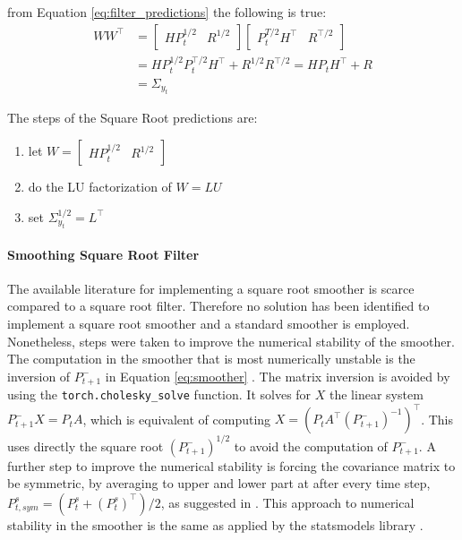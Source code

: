 \documentclass{article}
\begin{document}
from Equation \ref{eq:filter_predictions} the following is true:
\begin{align*}
  WW^\top &=
  \begin{bmatrix}HP_{t}^{1/2} & R^{1/2}\end{bmatrix}\begin{bmatrix}P_{t}^{T/2}H^\top & R^{\top/2}\end{bmatrix} \\
  &= HP_{t}^{1/2}P_{t}^{\top/2}H^\top + R^{1/2}R^{\top/2} = HP_{t}H^\top + R \\ &= \Sigma_{y_t}
\end{align*}

The steps of the Square Root predictions are:
\begin{enumerate}
    \item let  $W = \begin{bmatrix}HP_t^{1/2} & R^{1/2}\end{bmatrix}$
    \item do the LU factorization of $W=LU$
    \item set $\Sigma_{y_t}^{1/2} = L^\top$
\end{enumerate}

\paragraph{Smoothing Square Root Filter} The available literature for implementing a square root smoother is scarce compared to a square root filter. Therefore no solution has been identified to implement a square root smoother and a standard smoother is employed.
Nonetheless, steps were taken to improve the numerical stability of the smoother.
The computation in the smoother that is most numerically unstable is the inversion of $P^-_{t+1}$ in Equation \ref{eq:smoother} \cite{mohinder_s_grewal_kalman_2001}. The matrix inversion is avoided by using the \verb|torch.cholesky_solve| function. It solves for $X$ the linear system $P^-_{t+1}X=P_tA$, which is equivalent of computing $X = (P_tA^\top(P^-_{t+1})^{-1})^\top$. This uses directly the square root $(P^-_{t+1})^{1/2}$ to avoid the computation of $P^-_{t+1}$. A further step to improve the numerical stability is forcing the covariance matrix to be symmetric, by averaging to upper and lower part at after every time step, $P^s_{t, sym} = (P^s_t + (P^s_t)^\top)/2$, as suggested in \textcite{dan_simon_optimal_2006}.
This approach to numerical stability in the smoother is the same as applied by the \textsf{statsmodels} library \cite{noauthor_statsmodelstsastatespacekalman_filterkalmanfilter_nodate}.
\end{document}
